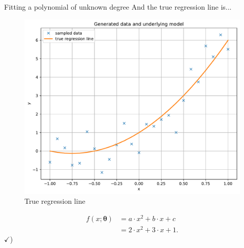 \documentclass[11pt,aspectratio=1610,dvipsnames]{beamer}
\newcommand{\btheta}{\boldsymbol{\theta}}
\begin{document}
\begin{frame}{Fitting a polynomial of unknown degree}
	And the true regression line is...
	
	\begin{minipage}{.6\linewidth}
	\begin{figure}
		\centering
		\includegraphics[width=\linewidth]{data_regression_line_sigma_07a}
		\caption{True regression line}
	\end{figure}
	\end{minipage}
\begin{minipage}{.39\linewidth}
	\begin{align*}
	f(x;\btheta)&=a\cdot x^2+b\cdot x+c\\&=2\cdot x^2+3\cdot x+1.
	\end{align*}
	\centering
	 $\checkmark$)
\end{minipage}
	

\end{frame}
\end{document}
